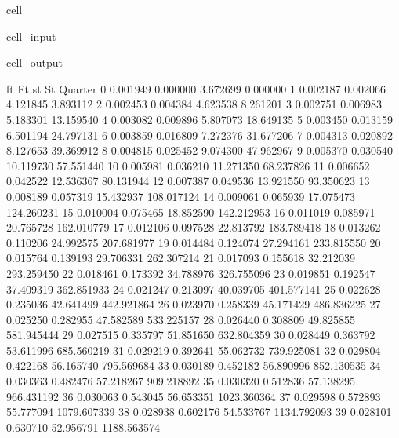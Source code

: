 \documentclass[letterpaper,10pt,english]{jupyterBook}
\begin{document}
\begin{sphinxuseclass}{cell}
\begin{sphinxVerbatimInput}
\begin{sphinxuseclass}{cell_input}
\begin{sphinxVerbatim}[commandchars=\\\{\}]
\end{sphinxVerbatim}

\end{sphinxuseclass}\end{sphinxVerbatimInput}
\begin{sphinxVerbatimOutput}

\begin{sphinxuseclass}{cell_output}
\begin{sphinxVerbatim}[commandchars=\\\{\}]
               ft        Ft         st           St
Quarter                                            
0        0.001949  0.000000   3.672699     0.000000
1        0.002187  0.002066   4.121845     3.893112
2        0.002453  0.004384   4.623538     8.261201
3        0.002751  0.006983   5.183301    13.159540
4        0.003082  0.009896   5.807073    18.649135
5        0.003450  0.013159   6.501194    24.797131
6        0.003859  0.016809   7.272376    31.677206
7        0.004313  0.020892   8.127653    39.369912
8        0.004815  0.025452   9.074300    47.962967
9        0.005370  0.030540  10.119730    57.551440
10       0.005981  0.036210  11.271350    68.237826
11       0.006652  0.042522  12.536367    80.131944
12       0.007387  0.049536  13.921550    93.350623
13       0.008189  0.057319  15.432937   108.017124
14       0.009061  0.065939  17.075473   124.260231
15       0.010004  0.075465  18.852590   142.212953
16       0.011019  0.085971  20.765728   162.010779
17       0.012106  0.097528  22.813792   183.789418
18       0.013262  0.110206  24.992575   207.681977
19       0.014484  0.124074  27.294161   233.815550
20       0.015764  0.139193  29.706331   262.307214
21       0.017093  0.155618  32.212039   293.259450
22       0.018461  0.173392  34.788976   326.755096
23       0.019851  0.192547  37.409319   362.851933
24       0.021247  0.213097  40.039705   401.577141
25       0.022628  0.235036  42.641499   442.921864
26       0.023970  0.258339  45.171429   486.836225
27       0.025250  0.282955  47.582589   533.225157
28       0.026440  0.308809  49.825855   581.945444
29       0.027515  0.335797  51.851650   632.804359
30       0.028449  0.363792  53.611996   685.560219
31       0.029219  0.392641  55.062732   739.925081
32       0.029804  0.422168  56.165740   795.569684
33       0.030189  0.452182  56.890996   852.130535
34       0.030363  0.482476  57.218267   909.218892
35       0.030320  0.512836  57.138295   966.431192
36       0.030063  0.543045  56.653351  1023.360364
37       0.029598  0.572893  55.777094  1079.607339
38       0.028938  0.602176  54.533767  1134.792093
39       0.028101  0.630710  52.956791  1188.563574
\end{sphinxVerbatim}

\end{sphinxuseclass}\end{sphinxVerbatimOutput}

\end{sphinxuseclass}
\end{document}
